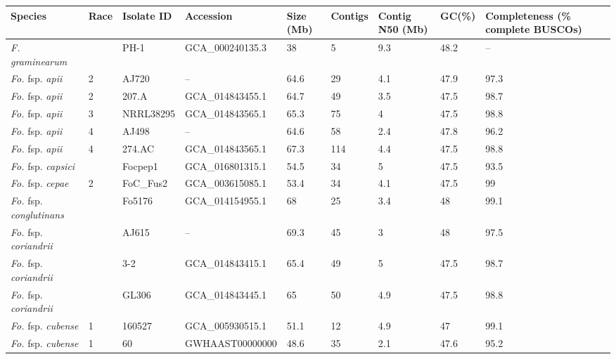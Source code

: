 \begin{ThreePartTable}
\begin{longtable}[c]{@{}C{2.5cm}C{0.8cm}C{2cm}C{2.2cm}C{1.5cm}C{1.5cm}C{1.5cm}C{0.9cm}C{1.8cm}C{1.8cm}@{}}
\label{tab:GenomeDB}\\
\toprule
\textbf{Species} &
  \textbf{Race} &
  \textbf{Isolate ID} &
  \textbf{Accession} &
  \textbf{Size (Mb)} &
  \textbf{Contigs} &
  \textbf{Contig N50 (Mb)} &
  \textbf{GC(\%)} &
  \textbf{Completeness (\% complete BUSCOs)} \\* \midrule
\endhead
%
\bottomrule
\endfoot
%
\endlastfoot
%
\textit{F. graminearum}        &     & PH-1         & GCA\_000240135.3 & 38   & 5     & 9.3  & 48.2 &--    \\
\textit{Fo.} fsp. \textit{apii}         & 2   & AJ720        &--             & 64.6 & 29    & 4.1  & 47.9 & 97.3 \\
\textit{Fo.} fsp. \textit{apii}         & 2   & 207.A        & GCA\_014843455.1 & 64.7 & 49    & 3.5  & 47.5 & 98.7 \\
\textit{Fo.} fsp. \textit{apii}         & 3   & NRRL38295    & GCA\_014843565.1 & 65.3 & 75    & 4    & 47.5 & 98.8 \\
\textit{Fo.} fsp. \textit{apii}         & 4   & AJ498        & --             & 64.6 & 58    & 2.4  & 47.8 & 96.2 \\
\textit{Fo.} fsp. \textit{apii}         & 4   & 274.AC       & GCA\_014843565.1 & 67.3 & 114   & 4.4  & 47.5 & 98.8 \\
\textit{Fo.} fsp. \textit{capsici}      &     & Focpep1      & GCA\_016801315.1 & 54.5 & 34    & 5    & 47.5 & 93.5    \\
\textit{Fo.} fsp. \textit{cepae}        & 2   & FoC\_Fus2    & GCA\_003615085.1 & 53.4 & 34    & 4.1  & 47.5 & 99   \\
\textit{Fo.} fsp. \textit{conglutinans} &     & Fo5176       & GCA\_014154955.1 & 68   & 25    & 3.4  & 48   & 99.1 \\
\textit{Fo.} fsp. \textit{coriandrii}   &     & AJ615        &--             & 69.3 & 45    & 3    & 48   & 97.5 \\
\textit{Fo.} fsp. \textit{coriandrii}   &     & 3-2          & GCA\_014843415.1 & 65.4 & 49    & 5    & 47.5 & 98.7 \\
\textit{Fo.} fsp. \textit{coriandrii}   &     & GL306        & GCA\_014843445.1 & 65   & 50    & 4.9  & 47.5 & 98.8 \\
\textit{Fo.} fsp. \textit{cubense}      & 1   & 160527       & GCA\_005930515.1 & 51.1 & 12    & 4.9  & 47   & 99.1 \\
\textit{Fo.} fsp. \textit{cubense}      & 1   & 60           & GWHAAST00000000  & 48.6 & 35    & 2.1  & 47.6 & 95.2 \\

\end{longtable}
\end{ThreePartTable}

